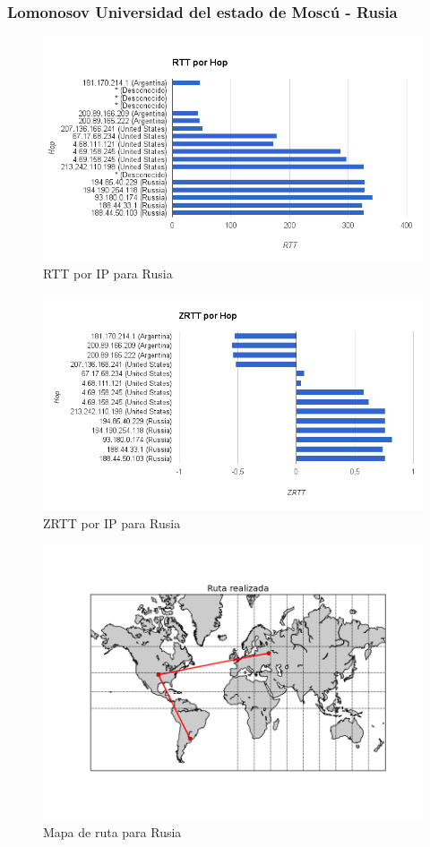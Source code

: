 \subsubsection{Lomonosov Universidad del estado de Moscú - Rusia}

\begin{figure}[H]
  \centering
    \includegraphics[width=1\textwidth]{../Experimentacion/Rusia/rtt.png}
    \caption{RTT por IP para Rusia}
  \label{rtt-rus}
\end{figure}

\begin{figure}[H]
  \centering
    \includegraphics[width=1\textwidth]{../Experimentacion/Rusia/zrtt.png}
    \caption{ZRTT por IP para Rusia }
  \label{zrtt-rus}
\end{figure}

\begin{figure}[H]
  \centering
    \includegraphics[width=1\textwidth]{../Experimentacion/Rusia/map.png}
    \caption{Mapa de ruta para Rusia}
  \label{map-rus}
\end{figure}


